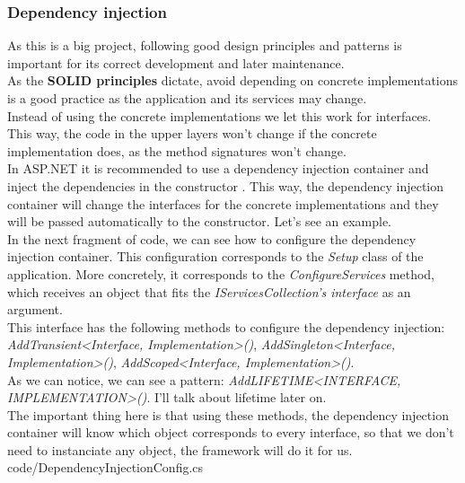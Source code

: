         \subsubsection{Dependency injection}
        As this is a big project, following good design principles and patterns is important for its correct development and later maintenance. \\

        As the \textbf{SOLID principles} dictate, avoid depending on concrete implementations is a good practice as the application and its services may change. \\
        Instead of using the concrete implementations we let this work for interfaces. This way, the code in the upper layers won't change if the concrete implementation does, as the method signatures won't change. \\

        In ASP.NET it is recommended to use a dependency injection container and inject the dependencies in the constructor \cite{DI}. This way, the dependency injection container will change the interfaces for the concrete implementations and they will be passed automatically to the constructor. Let's see an example. \\

        In the next fragment of code, we can see how to configure the dependency injection container. This configuration corresponds to the \textit{Setup} class of the application. More concretely, it corresponds to the \textit{ConfigureServices} method, which receives an object that fits the \textit{IServicesCollection's interface} as an argument. \\
        This interface has the following methods to configure the dependency injection: \textit{AddTransient<Interface, Implementation>()}, \textit{AddSingleton<Interface, Implementation>()}, \textit{AddScoped<Interface, Implementation>()}. \\
        As we can notice, we can see a pattern: \textit{Add{LIFETIME}<{INTERFACE}, {IMPLEMENTATION}>()}. I'll talk about lifetime later on. \\

        The important thing here is that using these methods, the dependency injection container will know which object corresponds to every interface, so that we don't need to instanciate any object, the framework will do it for us. \\
        
        
        {code/DependencyInjectionConfig.cs}
        

